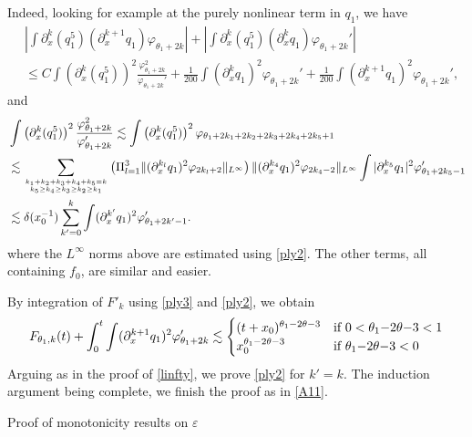 \documentclass[11pt,a4paper,reqno]{amsart}
\makeatletter
\theoremstyle{remark}
\numberwithin{equation}{section}
\def\section{\@startsection{section}{1}%
  \z@{1.5\linespacing\@plus\linespacing}{.5\linespacing}%
  {\normalfont\bfseries\large\centering}}
\def\e{\varepsilon}
\makeatother
\begin{document}
Indeed, looking for example at the purely nonlinear term in $q_1$, we have
\begin{align*}
&\left|\int  \partial_x^k (q_1^5)  (\partial_x^{k+1} q_1) \varphi_{\theta_1+2k} \right|
+ \left|\int  \partial_x^k (q_1^5)  (\partial_x^{k} q_1) \varphi_{\theta_1+2k}' \right|
\\
&\leq C \int \left(\partial_x^k (q_1^5)\right)^2 \frac {\varphi_{\theta_1+2k}^2}{\varphi_{\theta_1+2k}'}
+ \frac 1{200}\int (\partial_x^{k} q_1)^2 \varphi_{\theta_1+2k}'+\frac 1{200} \int (\partial_x^{k+1} q_1)^2  \varphi_{\theta_1+2k}' ,
\end{align*}
and
\begin{align*}
& \int \left(\partial_x^k (q_1^5)\right)^2 \frac {\varphi_{\theta_1+2k}^2}{\varphi_{\theta_1+2k}'}
\lesssim
\int \left(\partial_x^k (q_1^5)\right)^2 \varphi_{\theta_1+ 2 k_1+2k_2+2k_3+2k_4+2k_5+1}\\
& \lesssim \sum_{ \genfrac{}{}{0pt}{2}{k_1+k_2+k_3+k_4+k_5=k}{k_5\geq k_4\geq k_3\geq k_2\geq k_1}
} \left( \Pi_{l=1}^3 \| (\partial_x^{k_l} q_1 )^2 {\varphi_{2k_l+2}} \|_{L^\infty} \right) 
\| (\partial_x^{k_4} q_1 )^2 {\varphi_{2k_4-2}} \|_{L^\infty}\int |\partial_x^{k_5} q_1|^2\varphi'_{\theta_1+2k_5-1} 
\\
& \lesssim \delta(x_0^{-1})\sum_{k'=0}^k \int (\partial_x^{k'} q_1)^2  \varphi_{\theta_1+2k'-1}'.  \end{align*}
where the $L^\infty$ norms above are estimated using \eqref{ply2}.
The other terms, all containing $f_0$, are similar and easier.

By integration of $F'_k$ using \eqref{ply3} and \eqref{ply2}, we obtain
$$
F_{\theta_1,k}(t) + \int_0^t \int (\partial_x^{k+1} q_1)^2 \varphi_{\theta_1+2k}' \lesssim  
\begin{cases} (t+x_0)^{ \theta_1 -2 \theta-3 } & \hbox{if $0<\theta_1 {-}2 \theta{-}3<1$}  \\
  x_0^{ \theta_1 -2 \theta-3 } & \hbox{if $\theta_1 {-}2 \theta{-}3<0$} \end{cases} 
$$
Arguing as in the proof of \eqref{linfty}, we prove \eqref{ply2}   for $k'=k$.
The induction argument being complete, we finish the proof as in \eqref{A11}.
 

\section{Proof of monotonicity results on $\e$}\label{appA}
\end{document}
